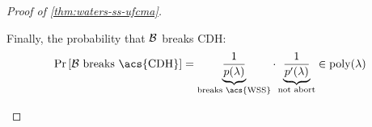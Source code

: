 \begin{proof}[Proof of \cref{thm:waters-ss-ufcma}]
\begin{itemize}
			Finally, the probability that $\mathcal{B}$ breaks \ac{CDH}:
			\begin{equation*}
				\Pr{\B \text{ breaks \acs{CDH}}} = \underbrace{\frac{1}{p(\lambda)}}_{\text{breaks \acs{WSS}}} \cdot \underbrace{\frac{1}{p'(\lambda)}}_{\text{not abort}} \in \poly(\lambda)
			\end{equation*}
	\end{itemize}
\end{proof}
